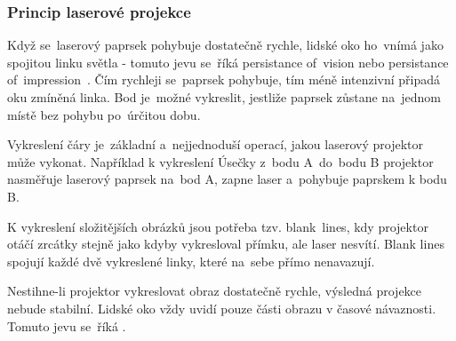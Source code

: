 
\subsubsection{Princip laserové projekce}\label{sec:projection-princip}
Když se~laserový paprsek pohybuje dostatečně rychle, lidské oko ho~vnímá jako spojitou linku světla - tomuto jevu se~říká persistance of~vision nebo persistance of~impression~\cite{persistance-of-vision}.
Čím rychleji se~paprsek pohybuje, tím méně intenzivní připadá oku zmíněná linka. Bod je~možné vykreslit, jestliže paprsek zůstane na~jednom místě bez pohybu po~úrčitou dobu.

Vykreslení čáry je~základní a~nejjednoduší operací, jakou laserový projektor může vykonat. Například k vykreslení Úsečky z~bodu A~do~bodu B projektor nasměřuje laserový paprsek na~bod A, zapne laser a~pohybuje paprskem k bodu B.

K vykreslení složitějších obrázků jsou potřeba tzv. blank\ lines, kdy projektor otáčí zrcátky stejně jako kdyby vykresloval přímku, ale laser nesvítí. Blank lines spojují každé dvě vykreslené linky, které na~sebe přímo nenavazují.

Nestihne-li projektor vykreslovat obraz dostatečně rychle, výsledná projekce nebude stabilní. Lidské oko vždy uvidí pouze části obrazu v časové návaznosti. Tomuto jevu se~říká .
